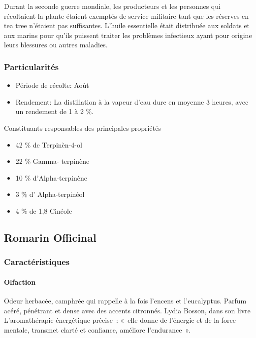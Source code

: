 \documentclass[12pt,a4wide]{article}
\begin{document}
Durant la seconde guerre mondiale, les producteurs et les personnes qui récoltaient la plante étaient exemptés de service militaire tant que les réserves en tea tree n'étaient pas suffisantes. L'huile essentielle était distribuée aux soldats et aux marins pour qu'ils puissent traiter les problèmes infectieux ayant pour origine leurs blessures ou autres maladies.

\subsubsection{Particularités}
\label{sec-4-9-4}
\begin{itemize}
\item Période de récolte: Août
\item Rendement: La distillation à la vapeur d'eau dure en moyenne 3 heures, avec un rendement de 1 à 2 \%.
\end{itemize}


Constituants responsables des principales propriétés
\begin{itemize}
\item 42 \% de Terpinèn-4-ol
\item 22 \% Gamma- terpinène
\item 10 \% d'Alpha-terpinène
\item 3 \% d' Alpha-terpinéol
\item 4 \% de 1,8 Cinéole
\end{itemize}




\subsection{Romarin Officinal}
\label{sec-4-10}



\subsubsection{Caractéristiques}
\label{sec-4-10-1}
\paragraph{Olfaction}
\label{sec-4-10-1-1}
Odeur herbacée, camphrée qui rappelle à la fois l'encens et l'eucalyptus. Parfum acéré, pénétrant et dense avec des accents citronnés.
Lydia Bosson, dans son livre L'aromathérapie énergétique précise : « elle donne de l'énergie et de la force mentale, transmet clarté et confiance, améliore l'endurance ».
\end{document}
